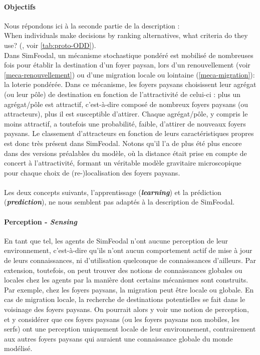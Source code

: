 \paragraph{Objectifs} Nous répondons ici à la seconde partie de la description :\\
\og When individuals make decisions by ranking alternatives, what criteria do they use?\fg{} (\textcite{grimm_documenting_2017}, voir \cref{tab:proto-ODD}).\\
Dans SimFeodal, un mécanisme stochastique pondéré est mobilisé de nombreuses fois pour établir la destination d'un foyer paysan, lors d'un renouvellement (voir \cref{meca-renouvellement}) ou d'une migration locale ou lointaine (\cref{meca-migration}): la \og loterie pondérée\fg{}.
Dans ce mécanisme, les foyers paysans \og choisissent\fg{} leur agrégat (ou leur pôle) de destination en fonction de l'attractivité de celui-ci :
plus un agrégat/pôle est attractif, c'est-à-dire composé de nombreux foyers paysans (ou attracteurs), plus il est susceptible d'attirer.
Chaque agrégat/pôle, y compris le moins attractif, a toutefois une probabilité, faible, d'attirer de nouveaux foyers paysans.
Le classement d'attracteurs en fonction de leurs caractéristiques propres est donc très présent dans SimFeodal.
Notons qu'il l'a de plus été plus encore dans des versions préalables du modèle, où la distance était prise en compte de concert à l'attractivité, formant un véritable modèle gravitaire microscopique pour chaque choix de (re-)localisation des foyers paysans.

\paragraph[Learning \& Prediction]{} Les deux concepts suivants, l'apprentissage (\textit{\textbf{learning}}) et la prédiction (\textit{\textbf{prediction}}), ne nous semblent pas adaptés à la description de SimFeodal.

\paragraph{Perception - \textit{Sensing}} En tant que tel, les agents de SimFeodal n'ont aucune perception de leur environnement, c'est-à-dire qu'ils n'ont aucun comportement \og actif\fg{} de mise à jour de leurs connaissances, ni d'utilisation quelconque de connaissances d'ailleurs.
Par extension, toutefois, on peut trouver des notions de connaissances globales ou locales chez les agents par la manière dont certains mécanismes sont construits.
Par exemple, chez les foyers paysans, la migration peut être locale ou globale. 
En cas de migration locale, la recherche de destinations potentielles se fait dans le voisinage des foyers paysans.
On pourrait alors y voir une notion de perception, et y considérer que ces foyers paysans (ou les foyers paysans non mobiles, les serfs) ont une perception uniquement locale de leur environnement, contrairement aux autres foyers paysans qui auraient une connaissance globale du monde modélisé.

